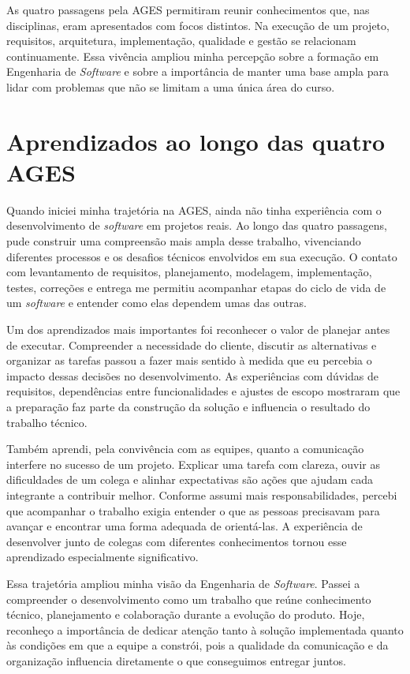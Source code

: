 As quatro passagens pela \ac{AGES} permitiram reunir conhecimentos que, nas disciplinas, eram apresentados com focos distintos. Na execução de um projeto, requisitos, arquitetura, implementação, qualidade e gestão se relacionam continuamente. Essa vivência ampliou minha percepção sobre a formação em Engenharia de \textit{Software} e sobre a importância de manter uma base ampla para lidar com problemas que não se limitam a uma única área do curso.

\section{Aprendizados ao longo das quatro AGES}

Quando iniciei minha trajetória na \ac{AGES}, ainda não tinha experiência com o desenvolvimento de \textit{software} em projetos reais. Ao longo das quatro passagens, pude construir uma compreensão mais ampla desse trabalho, vivenciando diferentes processos e os desafios técnicos envolvidos em sua execução. O contato com levantamento de requisitos, planejamento, modelagem, implementação, testes, correções e entrega me permitiu acompanhar etapas do ciclo de vida de um \textit{software} e entender como elas dependem umas das outras.

Um dos aprendizados mais importantes foi reconhecer o valor de planejar antes de executar. Compreender a necessidade do cliente, discutir as alternativas e organizar as tarefas passou a fazer mais sentido à medida que eu percebia o impacto dessas decisões no desenvolvimento. As experiências com dúvidas de requisitos, dependências entre funcionalidades e ajustes de escopo mostraram que a preparação faz parte da construção da solução e influencia o resultado do trabalho técnico.

Também aprendi, pela convivência com as equipes, quanto a comunicação interfere no sucesso de um projeto. Explicar uma tarefa com clareza, ouvir as dificuldades de um colega e alinhar expectativas são ações que ajudam cada integrante a contribuir melhor. Conforme assumi mais responsabilidades, percebi que acompanhar o trabalho exigia entender o que as pessoas precisavam para avançar e encontrar uma forma adequada de orientá-las. A experiência de desenvolver junto de colegas com diferentes conhecimentos tornou esse aprendizado especialmente significativo.

Essa trajetória ampliou minha visão da Engenharia de \textit{Software}. Passei a compreender o desenvolvimento como um trabalho que reúne conhecimento técnico, planejamento e colaboração durante a evolução do produto. Hoje, reconheço a importância de dedicar atenção tanto à solução implementada quanto às condições em que a equipe a constrói, pois a qualidade da comunicação e da organização influencia diretamente o que conseguimos entregar juntos.

